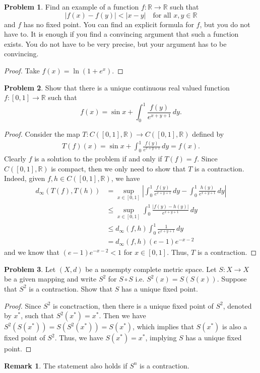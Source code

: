 \documentclass[11pt]{article}
\theoremstyle{definition}
\newtheorem{problem}{Problem}
\newtheorem{remark}{Remark}[problem]
\theoremstyle{definition}
\begin{document}
\begin{problem}
Find an example of a function $f:\mathbb{R}\to\mathbb{R}$ such that
$$
|f(x)-f(y)|<|x-y|
\quad
\mbox{for all $x,y\in\mathbb{R}$}
$$
and $f$ has no fixed point. You can find an explicit formula for $f$, but you do not have to. It is enough if you find a convincing argument
that such a function exists. You do not have to be very precise, but your argument has to be convincing.
\end{problem}

\begin{proof}
Take $f(x) = \ln\left(1 + e^x\right)$.
\end{proof}

\medskip


\begin{problem}
Show that there is a unique continuous real valued
function $f:[0,1]\to\mathbb{R}$ such that
$$
f(x) = \sin x + \int_{0}^1 \frac{f(y)}{e^{x+y+1}}\, dy.
$$
\end{problem}
\begin{proof}
Consider the map $T:C([0,1],\mathbb{R})\to C([0,1],\mathbb{R})$ defined by 
\begin{align*}
    T(f)(x) = \sin x + \int^1_0 \frac{f(y)}{e^{x+y+1}}\, dy = f(x).
\end{align*}
Clearly $f$ is a solution to the problem if and only if $T(f) = f$. Since $C([0,1],\mathbb{R})$ is compact, then we only need to show that $T$ is a contraction. Indeed, given $f,h\in C([0,1],\mathbb{R})$, we have
\begin{align*}
    d_\infty(T(f),T(h)) & = \sup_{x\in [0,1]} \left|\int_{0}^1 \frac{f(y)}{e^{x+y+1}}\, dy - \int_{0}^1 \frac{h(y)}{e^{x+y+1}}\, dy \right| \\
    & \leq \sup_{x\in [0,1]} \int^1_0 \frac{\left|f(y) - h(y)\right|}{e^{x+y+1}} \, dy \\
    & \leq d_\infty(f,h) \int^1_0 \frac{1}{e^{x+y+1}} \, dy \\
    & = d_\infty(f,h) (e-1)e^{-x-2}
\end{align*}
and we know that $(e-1)e^{-x-2} < 1$ for $x\in [0,1]$. Thus, $T$ is a contraction.
\end{proof}

\medskip


\begin{problem}
Let $(X,d)$ be a nonempty complete metric space.
Let $S:X\to X$ be a given mapping and write $S^2$ for
$S\circ S$ i.e. $S^2(x)=S(S(x))$. Suppose that $S^2$ is a
contraction. Show that $S$ has a unique fixed point.
\end{problem}
\begin{proof}
Since $S^2$ is conctraction, then there is a unique fixed point of $S^2$, denoted by $x^*$, such that $S^2(x^*) = x^*$. Then we have $S^2(S(x^*)) = S\left(S^2(x^*)\right) = S(x^*)$, which implies that $S(x^*)$ is also a fixed point of $S^2$. Thus, we have $S(x^*) = x^*$, implying $S$ has a unique fixed point.
\end{proof}
\begin{remark}
The statement also holds if $S^n$ is a contraction.
\end{remark}
\end{document}
